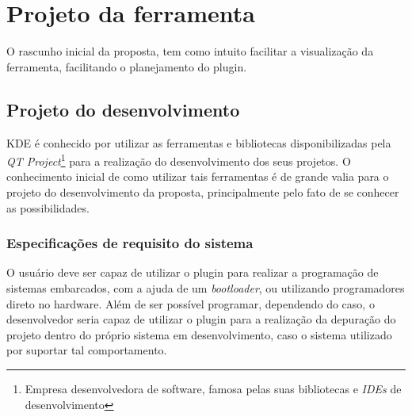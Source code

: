 \chapter{Projeto da ferramenta}
O rascunho inicial da proposta, tem como intuito facilitar a visualização da ferramenta, facilitando o planejamento do plugin.



\section{Projeto do desenvolvimento}

KDE é conhecido por utilizar as ferramentas e bibliotecas disponibilizadas pela \textit{QT Project}\footnote{Empresa desenvolvedora  de software, famosa pelas suas bibliotecas e \textit{IDEs} de desenvolvimento} para a realização do desenvolvimento dos seus projetos. O conhecimento inicial de como utilizar tais ferramentas é de grande valia para o projeto do desenvolvimento da proposta, principalmente pelo fato de se conhecer as possibilidades.

\subsection{Especificações de requisito do sistema}

O usuário deve ser capaz de utilizar o plugin para realizar a programação de sistemas embarcados, com a ajuda de um \textit{bootloader}, ou utilizando programadores direto no hardware. Além de ser possível programar, dependendo do caso, o desenvolvedor seria capaz de utilizar o plugin para a realização da depuração do projeto dentro do próprio sistema em desenvolvimento, caso o sistema utilizado por suportar tal comportamento.

